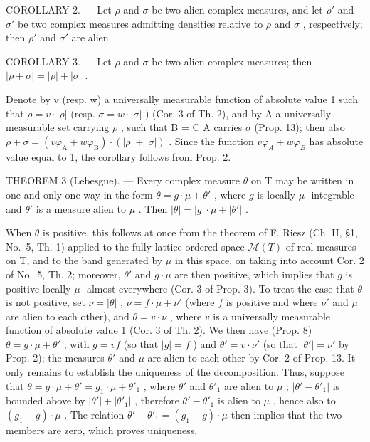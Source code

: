 COROLLARY 2. --- Let \(\rho\) and \(\sigma\) be two alien complex measures, and let \(\rho'\) and \(\sigma'\) be two complex measures admitting densities relative to \(\rho\) and \(\sigma\) , respectively; then \(\rho'\) and \(\sigma'\) are alien.

COROLLARY 3. --- Let \(\rho\) and \(\sigma\) be two alien complex measures; then \(|\rho + \sigma| = |\rho| + |\sigma|\) .

Denote by v (resp. w) a universally measurable function of absolute value 1 such that \(\rho = v \cdot |\rho|\) (resp. \(\sigma = w \cdot |\sigma|\) ) (Cor. 3 of Th. 2), and by A a universally measurable set carrying \(\rho\) , such that B = C A carries \(\sigma\) (Prop. 13); then also \(\rho + \sigma = (v\varphi_{\mathrm{A}} + w\varphi_{\mathrm{B}}) \cdot (|\rho| + |\sigma|)\) . Since the function \(v\varphi_{A} + w\varphi_{B}\) has absolute value equal to 1, the corollary follows from Prop. 2.

THEOREM 3 (Lebesgue). --- Every complex measure \(\theta\) on T may be written in one and only one way in the form \(\theta = g \cdot \mu + \theta'\) , where \(g\) is locally \(\mu\) -integrable and \(\theta'\) is a measure alien to \(\mu\) . Then \(|\theta| = |g| \cdot \mu + |\theta'|\) .

When \(\theta\) is positive, this follows at once from the theorem of F. Riesz (Ch. II, §1, No.~5, Th. 1) applied to the fully lattice-ordered space \(\mathcal{M}(T)\) of real measures on T, and to the band generated by \(\mu\) in this space, on taking into account Cor. 2 of No.~5, Th. 2; moreover, \(\theta'\) and \(g \cdot \mu\) are then positive, which implies that \(g\) is positive locally \(\mu\) -almost everywhere (Cor. 3 of Prop. 3). To treat the case that \(\theta\) is not positive, set \(\nu = |\theta|\) , \(\nu = f \cdot \mu + \nu'\) (where \(f\) is positive and where \(\nu'\) and \(\mu\) are alien to each other), and \(\theta = v \cdot \nu\) , where \(v\) is a universally measurable function of absolute value 1 (Cor. 3 of Th. 2). We then have (Prop. 8) \(\theta = g \cdot \mu + \theta'\) , with \(g = vf\) (so that \(|g| = f\) ) and \(\theta' = v \cdot \nu'\) (so that \(|\theta'| = \nu'\) by Prop. 2); the measures \(\theta'\) and \(\mu\) are alien to each other by Cor. 2 of Prop. 13. It only remains to establish the uniqueness of the decomposition. Thus, suppose that \(\theta = g \cdot \mu + \theta' = g_1 \cdot \mu + \theta'_1\) , where \(\theta'\) and \(\theta'_1\) are alien to \(\mu\) ; \(|\theta' - \theta'_1|\) is bounded above by \(|\theta'| + |\theta'_1|\) , therefore \(\theta' - \theta'_1\) is alien to \(\mu\) , hence also to \((g_1 - g) \cdot \mu\) . The relation \(\theta' - \theta'_1 = (g_1 - g) \cdot \mu\) then implies that the two members are zero, which proves uniqueness.

